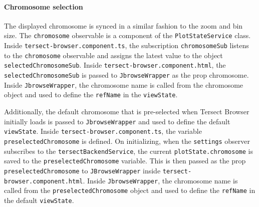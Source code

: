 \documentclass[12pt]{article}
\begin{document}
\paragraph{Chromosome selection}
The displayed chromosome is synced in a similar fashion to the zoom and bin size. The \verb +chromosome+ observable is a component of the \verb +PlotStateService+ class. Inside \verb +tersect-browser.component.ts+, the subscription \verb +chromosomeSub+ listens to the \verb +chromosome+ observable and assigns the latest value to the object \verb +selectedChromosomeSub+. Inside \verb +tersect-browser.component.html+, the \verb +selectedChromosomeSub+ is passed to \verb +JbrowseWrapper+ as the prop chromosome. Inside \verb +JbrowseWrapper+, the chromosome name is called from the chromosome object and used to define the \verb +refName+ in the \verb +viewState+. 

Additionally, the default chromosome that is pre-selected when Tersect Browser initially loads is passed to \verb +JbrowseWrapper+ and used to define the default \verb +viewState+. Inside \verb +tersect-browser.component.ts+, the variable \verb +preselectedChromosome+ is defined. On initializing, when the \verb +settings+ observer subscribes to the \verb +tersectBackendService+, the current \verb +plotState.chromosome+ is saved to the \verb +preselectedChromosome+ variable. This is then passed as the prop \verb +preselectedChromosome+ to \verb +JBrowseWrapper+ inside \verb +tersect-browser.component.html+.  Inside \verb +JbrowseWrapper+, the chromosome name is called from the \verb +preselectedChromosome+ object and used to define the \verb +refName+ in the default \verb +viewState+. 
\end{document}
